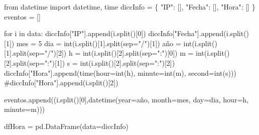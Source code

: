 \documentclass[
  letterpaper,
  DIV=11,
  numbers=noendperiod]{scrartcl}
\newenvironment{Shaded}{\begin{snugshade}}{\end{snugshade}}
\newcommand{\BuiltInTok}[1]{\textcolor[rgb]{0.00,0.23,0.31}{#1}}
\newcommand{\CommentTok}[1]{\textcolor[rgb]{0.37,0.37,0.37}{#1}}
\newcommand{\ControlFlowTok}[1]{\textcolor[rgb]{0.00,0.23,0.31}{#1}}
\newcommand{\DecValTok}[1]{\textcolor[rgb]{0.68,0.00,0.00}{#1}}
\newcommand{\ImportTok}[1]{\textcolor[rgb]{0.00,0.46,0.62}{#1}}
\newcommand{\KeywordTok}[1]{\textcolor[rgb]{0.00,0.23,0.31}{#1}}
\newcommand{\NormalTok}[1]{\textcolor[rgb]{0.00,0.23,0.31}{#1}}
\newcommand{\OperatorTok}[1]{\textcolor[rgb]{0.37,0.37,0.37}{#1}}
\newcommand{\StringTok}[1]{\textcolor[rgb]{0.13,0.47,0.30}{#1}}
\begin{document}
\begin{Shaded}
\begin{Highlighting}[]
\ImportTok{from}\NormalTok{ datetime }\ImportTok{import}\NormalTok{ datetime, time}
\NormalTok{diccInfo }\OperatorTok{=}\NormalTok{ \{}
    \StringTok{"IP"}\NormalTok{: [],}
    \StringTok{"Fecha"}\NormalTok{: [],}
    \StringTok{"Hora"}\NormalTok{: []}
\NormalTok{\}}
\NormalTok{eventos }\OperatorTok{=}\NormalTok{ []}

\ControlFlowTok{for}\NormalTok{ i }\KeywordTok{in}\NormalTok{ data:}
\NormalTok{    diccInfo[}\StringTok{"IP"}\NormalTok{].append(i.split()[}\DecValTok{0}\NormalTok{])}
\NormalTok{    diccInfo[}\StringTok{"Fecha"}\NormalTok{].append(i.split()[}\DecValTok{1}\NormalTok{])}
\NormalTok{    mes }\OperatorTok{=} \DecValTok{5}
\NormalTok{    dia }\OperatorTok{=} \BuiltInTok{int}\NormalTok{(i.split()[}\DecValTok{1}\NormalTok{].split(sep}\OperatorTok{=}\StringTok{"/"}\NormalTok{)[}\DecValTok{1}\NormalTok{])}
\NormalTok{    año }\OperatorTok{=} \BuiltInTok{int}\NormalTok{(i.split()[}\DecValTok{1}\NormalTok{].split(sep}\OperatorTok{=}\StringTok{"/"}\NormalTok{)[}\DecValTok{2}\NormalTok{])}
\NormalTok{    h }\OperatorTok{=} \BuiltInTok{int}\NormalTok{(i.split()[}\DecValTok{2}\NormalTok{].split(sep}\OperatorTok{=}\StringTok{":"}\NormalTok{)[}\DecValTok{0}\NormalTok{])}
\NormalTok{    m }\OperatorTok{=} \BuiltInTok{int}\NormalTok{(i.split()[}\DecValTok{2}\NormalTok{].split(sep}\OperatorTok{=}\StringTok{":"}\NormalTok{)[}\DecValTok{1}\NormalTok{])}
\NormalTok{    s }\OperatorTok{=} \BuiltInTok{int}\NormalTok{(i.split()[}\DecValTok{2}\NormalTok{].split(sep}\OperatorTok{=}\StringTok{":"}\NormalTok{)[}\DecValTok{2}\NormalTok{])}
\NormalTok{    diccInfo[}\StringTok{"Hora"}\NormalTok{].append(time(hour}\OperatorTok{=}\BuiltInTok{int}\NormalTok{(h), minute}\OperatorTok{=}\BuiltInTok{int}\NormalTok{(m), second}\OperatorTok{=}\BuiltInTok{int}\NormalTok{(s)))}
    \CommentTok{\#diccInfo["Hora"].append(i.split()[2])}
    
\NormalTok{    eventos.append((i.split()[}\DecValTok{0}\NormalTok{],datetime(year}\OperatorTok{=}\NormalTok{año, month}\OperatorTok{=}\NormalTok{mes, day}\OperatorTok{=}\NormalTok{dia, hour}\OperatorTok{=}\NormalTok{h, minute}\OperatorTok{=}\NormalTok{m)))}
\end{Highlighting}
\end{Shaded}

\begin{Shaded}
\begin{Highlighting}[]
\NormalTok{dfHora }\OperatorTok{=}\NormalTok{ pd.DataFrame(data}\OperatorTok{=}\NormalTok{diccInfo)}
\end{Highlighting}
\end{Shaded}
\end{document}
